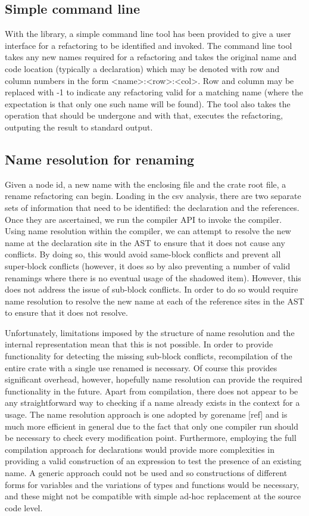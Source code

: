 \subsection{Simple command line}
With the library, a simple command line tool has been provided to give a user interface for a refactoring to be identified and invoked. The command line tool takes any new names required for a refactoring and takes the original name and code location (typically a declaration) which may be denoted with row and column numbers in the form <name>:<row>:<col>. Row and column may be replaced with -1 to indicate any refactoring valid for a matching name (where the expectation is that only one such name will be found). The tool also takes the operation that should be undergone and with that, executes the refactoring, outputing the result to standard output.

\subsection{Name resolution for renaming}
Given a node id, a new name with the enclosing file and the crate root file, a rename refactoring can begin. Loading in the csv analysis, there are two separate sets of information that need to be identified: the declaration and the references. Once they are ascertained, we run the compiler API to invoke the compiler. Using name resolution within the compiler, we can attempt to resolve the new name at the declaration site in the AST to ensure that it does not cause any conflicts. By doing so, this would avoid same-block conflicts and prevent all super-block conflicts (however, it does so by also preventing a number of valid renamings where there is no eventual usage of the shadowed item). However, this does not address the issue of sub-block conflicts. In order to do so would require name resolution to resolve the new name at each of the reference sites in the AST to ensure that it does not resolve. 

Unfortunately, limitations imposed by the structure of name resolution and the internal representation mean that this is not possible. In order to provide functionality for detecting the missing sub-block conflicts, recompilation of the entire crate with a single use renamed is necessary. Of course this provides significant overhead, however, hopefully name resolution can provide the required functionality in the future. Apart from compilation, there does not appear to be any straightforward way to checking if a name already exists in the context for a usage. The name resolution approach is one adopted by gorename [ref] and is much more efficient in general due to the fact that only one compiler run should be necessary to check every modification point. Furthermore, employing the full compilation approach for declarations would provide more complexities in providing a valid construction of an expression to test the presence of an existing name. A generic approach could not be used and so constructions of different forms for variables and the variations of types and functions would be necessary, and these might not be compatible with simple ad-hoc replacement at the source code level.

